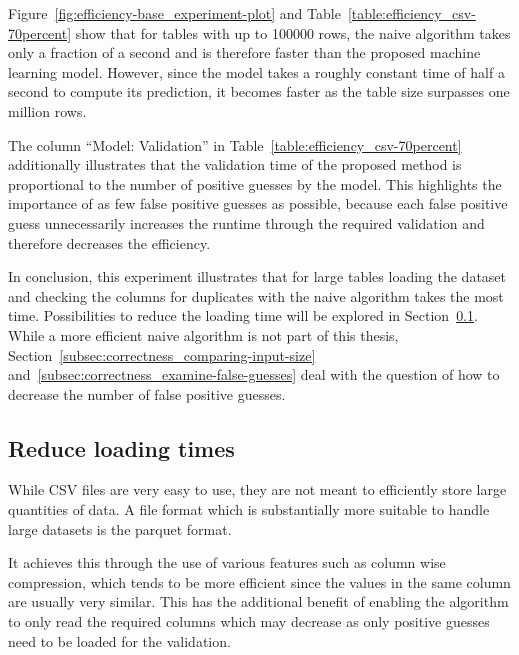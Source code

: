 Figure~\ref{fig:efficiency-base_experiment-plot} and Table~\ref{table:efficiency_csv-70percent} show that for tables with up to \num{100000} rows, the naive algorithm takes only a fraction of a second and is therefore faster than the proposed machine learning model. However, since the model takes a roughly constant time of half a second to compute its prediction, it becomes faster as the table size surpasses one million rows.

The column \enquote{Model: Validation} in Table~\ref{table:efficiency_csv-70percent} additionally illustrates that the validation time of the proposed method is proportional to the number of positive guesses by the model. This highlights the importance of as few false positive guesses as possible, because each false positive guess unnecessarily increases the runtime through the required validation and therefore decreases the efficiency.

In conclusion, this experiment illustrates that for large tables loading the dataset and checking the columns for duplicates with the naive algorithm takes the most time. Possibilities to reduce the loading time will be explored in Section~\ref{subsec:efficiency-shorter_loading_times}. While a more efficient naive algorithm is not part of this thesis, Section~\ref{subsec:correctness_comparing-input-size} and~\ref{subsec:correctness_examine-false-guesses} deal with the question of how to decrease the number of false positive guesses.






\subsection{Reduce loading times}\label{subsec:efficiency-shorter_loading_times}
While CSV files are very easy to use, they are not meant to efficiently store large quantities of data. A file format which is substantially more suitable to handle large datasets is the parquet format\cite{parquet-book}.

It achieves this through the use of various features such as column wise compression, which tends to be more efficient since the values in the same column are usually very similar. This has the additional benefit of enabling the algorithm to only read the required columns which may decrease \io{} as only positive guesses need to be loaded for the validation.

